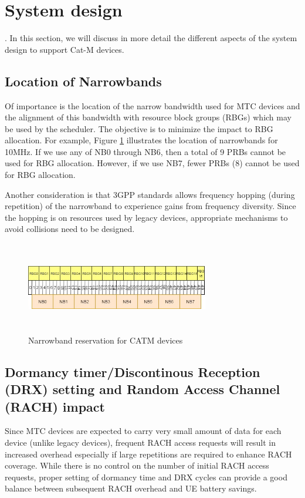 \documentclass[conference,compsoc]{IEEEtran}
\begin{document}
\section{System design}
.   In this section, we will discuss in more detail the different aspects of the system design to support Cat-M devices.

\subsection{Location of Narrowbands}
Of importance is the location of the narrow bandwidth used for MTC devices and the alignment of this bandwidth with resource block groups (RBGs) which may be used by the scheduler. The objective is to minimize the impact to RBG allocation.  For example, Figure \ref{fig_narrowband} illustrates the location of narrowbands for 10MHz. If we use any of NB0 through NB6, then a total of 9 PRBs cannot be used for RBG allocation. However, if we use NB7, fewer PRBs ($8$) cannot be used for RBG allocation.

Another consideration is that 3GPP standards allows frequency hopping (during repetition) of the narrowband  to experience gains from frequency diversity. Since the hopping is on resources used by legacy devices, appropriate mechanisms to avoid collisions need to be designed.

\begin{figure}[htbp]
\centerline{\includegraphics[height=40mm,width=80mm]{narrowband.png}}
\caption{Narrowband reservation for CATM devices}
\label{fig_narrowband}
\end{figure}


\subsection{Dormancy timer/Discontinous Reception (DRX) setting and Random Access Channel (RACH) impact}
 Since MTC devices are expected to carry very small amount of data for each device (unlike legacy devices), frequent RACH access requests will result in increased overhead especially if large repetitions are required to enhance RACH coverage. While there is no control on the number of initial RACH access requests, proper setting of dormancy time and DRX cycles can provide a good balance between subsequent RACH overhead and UE battery savings.
\end{document}
